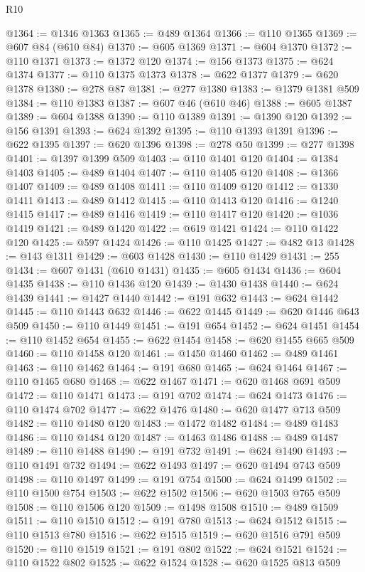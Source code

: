 \begin{lexlean}{R10}
\begin{coremodule}
@1364 := @1346 @1363
@1365 := @489 @1364
@1366 := @110 @1365
@1369 := @607 @84 (@610 @84)
@1370 := @605 @1369
@1371 := @604 @1370
@1372 := @110 @1371
@1373 := @1372 @120
@1374 := @156 @1373
@1375 := @624 @1374
@1377 := @110 @1375 @1373
@1378 := @622 @1377
@1379 := @620 @1378
@1380 := @278 @87
@1381 := @277 @1380
@1383 := @1379 @1381 @509
@1384 := @110 @1383
@1387 := @607 @46 (@610 @46)
@1388 := @605 @1387
@1389 := @604 @1388
@1390 := @110 @1389
@1391 := @1390 @120
@1392 := @156 @1391
@1393 := @624 @1392
@1395 := @110 @1393 @1391
@1396 := @622 @1395
@1397 := @620 @1396
@1398 := @278 @50
@1399 := @277 @1398
@1401 := @1397 @1399 @509
@1403 := @110 @1401 @120
@1404 := @1384 @1403
@1405 := @489 @1404
@1407 := @110 @1405 @120
@1408 := @1366 @1407
@1409 := @489 @1408
@1411 := @110 @1409 @120
@1412 := @1330 @1411
@1413 := @489 @1412
@1415 := @110 @1413 @120
@1416 := @1240 @1415
@1417 := @489 @1416
@1419 := @110 @1417 @120
@1420 := @1036 @1419
@1421 := @489 @1420
@1422 := @619 @1421
@1424 := @110 @1422 @120
@1425 := @597 @1424
@1426 := @110 @1425
@1427 := @482 @13
@1428 := @143 @1311
@1429 := @603 @1428
@1430 := @110 @1429
@1431 := 255
@1434 := @607 @1431 (@610 @1431)
@1435 := @605 @1434
@1436 := @604 @1435
@1438 := @110 @1436 @120
@1439 := @1430 @1438
@1440 := @624 @1439
@1441 := @1427 @1440
@1442 := @191 @632
@1443 := @624 @1442
@1445 := @110 @1443 @632
@1446 := @622 @1445
@1449 := @620 @1446 @643 @509
@1450 := @110 @1449
@1451 := @191 @654
@1452 := @624 @1451
@1454 := @110 @1452 @654
@1455 := @622 @1454
@1458 := @620 @1455 @665 @509
@1460 := @110 @1458 @120
@1461 := @1450 @1460
@1462 := @489 @1461
@1463 := @110 @1462
@1464 := @191 @680
@1465 := @624 @1464
@1467 := @110 @1465 @680
@1468 := @622 @1467
@1471 := @620 @1468 @691 @509
@1472 := @110 @1471
@1473 := @191 @702
@1474 := @624 @1473
@1476 := @110 @1474 @702
@1477 := @622 @1476
@1480 := @620 @1477 @713 @509
@1482 := @110 @1480 @120
@1483 := @1472 @1482
@1484 := @489 @1483
@1486 := @110 @1484 @120
@1487 := @1463 @1486
@1488 := @489 @1487
@1489 := @110 @1488
@1490 := @191 @732
@1491 := @624 @1490
@1493 := @110 @1491 @732
@1494 := @622 @1493
@1497 := @620 @1494 @743 @509
@1498 := @110 @1497
@1499 := @191 @754
@1500 := @624 @1499
@1502 := @110 @1500 @754
@1503 := @622 @1502
@1506 := @620 @1503 @765 @509
@1508 := @110 @1506 @120
@1509 := @1498 @1508
@1510 := @489 @1509
@1511 := @110 @1510
@1512 := @191 @780
@1513 := @624 @1512
@1515 := @110 @1513 @780
@1516 := @622 @1515
@1519 := @620 @1516 @791 @509
@1520 := @110 @1519
@1521 := @191 @802
@1522 := @624 @1521
@1524 := @110 @1522 @802
@1525 := @622 @1524
@1528 := @620 @1525 @813 @509

\end{coremodule}
\end{lexlean}
